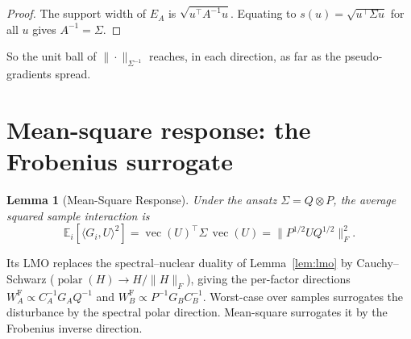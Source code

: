 \documentclass[11pt]{article}
\DeclarePairedDelimiter{\norm}{\lVert}{\rVert}
\newcommand{\polar}{\operatorname{polar}}
\newcommand{\E}{\mathbb{E}}
\DeclareMathOperator{\vecop}{vec}
\newcommand{\norm}[1]{\| #1\|}
\newtheorem{lemma}[proposition]{Lemma}
\begin{document}
\begin{proof}
The support width of $E_A$ is $\sqrt{u^\top A^{-1}u}$. Equating to
$s(u)=\sqrt{u^\top\Sigma u}$ for all $u$ gives $A^{-1}=\Sigma$.
\end{proof}

So the unit ball of $\norm{\cdot}_{\Sigma^{-1}}$ reaches, in each direction, as
far as the pseudo-gradients spread.

\section{Mean-square response: the Frobenius surrogate}
\label{app:frob}

\begin{lemma}[Mean-Square Response]
\label{lem:frob}
Under the ansatz $\Sigma=Q\otimes P$, the average squared sample interaction is
\begin{equation}
  \E_i[\langle G_i,U\rangle^2]=\vecop(U)^\top\Sigma\,\vecop(U)=\norm{P^{1/2}UQ^{1/2}}_F^2 .
  \label{eq:frob-response}
\end{equation}
\end{lemma}

Its LMO replaces the spectral--nuclear duality of Lemma~\ref{lem:lmo} by
Cauchy--Schwarz ($\polar(H)\to H/\norm{H}_F$), giving the per-factor directions
$W_A^{\mathrm F}\propto C_A^{-1}G_AQ^{-1}$ and $W_B^{\mathrm F}\propto P^{-1}G_BC_B^{-1}$.
Worst-case over samples surrogates the disturbance by the spectral polar
direction. Mean-square surrogates it by the Frobenius inverse direction.
\end{document}
